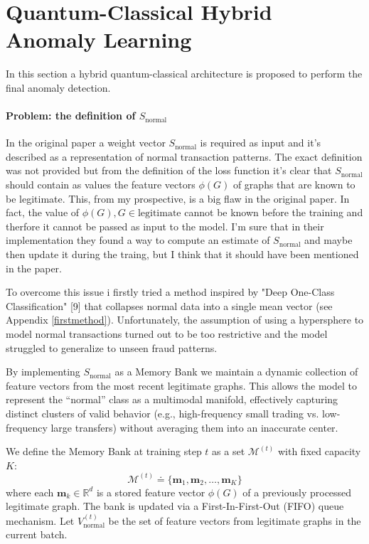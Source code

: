 \section{Quantum-Classical Hybrid Anomaly Learning}
In this section a hybrid quantum-classical architecture is proposed to perform the final anomaly detection.
\paragraph{Problem: the definition of {$S_{\text{normal}}$}}
In the original paper a weight vector \(S_\text{normal}\) is required as input and it's described as a representation of normal transaction patterns.
The exact definition was not provided but from the definition of the loss function it's clear that \(S_\text{normal}\) should contain as values the feature vectors \(\phi(G)\) of graphs that are known to be legitimate. This, from my prospective, is a big flaw in the original paper. In fact, the value of \(\phi(G), G \in \text{legitimate}\) cannot be known before the training and therfore it cannot be passed as input to the model. I'm sure that in their implementation they found a way to compute an estimate of \(S_\text{normal}\) and maybe then update it during the traing, but I think that it should have been mentioned in the paper.


To overcome this issue i firstly tried a method inspired by "Deep One-Class Classification" [9] that collapses normal data into a single mean vector (see Appendix \ref{firstmethod}). Unfortunately, the assumption of using a hypersphere to model normal transactions turned out to be too restrictive and the model struggled to generalize to unseen fraud patterns.

By implementing \(S_\text{normal}\) as a Memory Bank we maintain a dynamic collection of feature vectors from the most recent legitimate graphs. This allows the model to represent the ``normal'' class as a multimodal manifold, effectively capturing distinct clusters of valid behavior (e.g., high-frequency small trading vs. low-frequency large transfers) without averaging them into an inaccurate center.

We define the Memory Bank at training step $t$ as a set $\mathcal{M}^{(t)}$ with fixed capacity $K$:
\begin{equation}
    \mathcal{M}^{(t)} \doteq \{ \mathbf{m}_1, \mathbf{m}_2, \dots, \mathbf{m}_K \}
\end{equation}
where each $\mathbf{m}_k \in \mathbb{R}^d$ is a stored feature vector $\phi(G)$ of a previously processed legitimate graph. The bank is updated via a First-In-First-Out (FIFO) queue mechanism. Let $V_{\text{normal}}^{(t)}$ be the set of feature vectors from legitimate graphs in the current batch.

